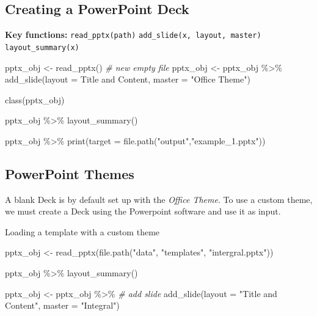 \documentclass[
]{book}
\newenvironment{Shaded}{\begin{snugshade}}{\end{snugshade}}
\newcommand{\AttributeTok}[1]{\textcolor[rgb]{0.77,0.63,0.00}{#1}}
\newcommand{\CommentTok}[1]{\textcolor[rgb]{0.56,0.35,0.01}{\textit{#1}}}
\newcommand{\FunctionTok}[1]{\textcolor[rgb]{0.00,0.00,0.00}{#1}}
\newcommand{\NormalTok}[1]{#1}
\newcommand{\OtherTok}[1]{\textcolor[rgb]{0.56,0.35,0.01}{#1}}
\newcommand{\SpecialCharTok}[1]{\textcolor[rgb]{0.00,0.00,0.00}{#1}}
\newcommand{\StringTok}[1]{\textcolor[rgb]{0.31,0.60,0.02}{#1}}
\begin{document}
\hypertarget{creating-a-powerpoint-deck}{%
\subsection{Creating a PowerPoint Deck}\label{creating-a-powerpoint-deck}}

\textbf{Key functions:}
\texttt{read\_pptx(path)} \texttt{add\_slide(x,\ layout,\ master)} \texttt{layout\_summary(x)}

\begin{Shaded}
\begin{Highlighting}[]
\NormalTok{pptx\_obj }\OtherTok{\textless{}{-}} \FunctionTok{read\_pptx}\NormalTok{() }\CommentTok{\# new empty file}
\NormalTok{pptx\_obj }\OtherTok{\textless{}{-}}\NormalTok{ pptx\_obj }\SpecialCharTok{\%\textgreater{}\%} 
  \FunctionTok{add\_slide}\NormalTok{(}\AttributeTok{layout  =} \StringTok{\textquotesingle{}Title and Content\textquotesingle{}}\NormalTok{, }\AttributeTok{master =} \StringTok{"Office Theme"}\NormalTok{)}

\FunctionTok{class}\NormalTok{(pptx\_obj)}

\NormalTok{pptx\_obj }\SpecialCharTok{\%\textgreater{}\%}
  \FunctionTok{layout\_summary}\NormalTok{()}

\NormalTok{pptx\_obj }\SpecialCharTok{\%\textgreater{}\%} 
  \FunctionTok{print}\NormalTok{(}\AttributeTok{target =} \FunctionTok{file.path}\NormalTok{(}\StringTok{"output"}\NormalTok{,}\StringTok{"example\_1.pptx"}\NormalTok{))}
\end{Highlighting}
\end{Shaded}

\hypertarget{powerpoint-themes}{%
\subsection{PowerPoint Themes}\label{powerpoint-themes}}

A blank Deck is by default set up with the \emph{Office Theme}. To use a custom theme, we must create a Deck using the Powerpoint software and use it as input.

Loading a template with a custom theme

\begin{Shaded}
\begin{Highlighting}[]
\NormalTok{pptx\_obj }\OtherTok{\textless{}{-}} \FunctionTok{read\_pptx}\NormalTok{(}\FunctionTok{file.path}\NormalTok{(}\StringTok{"data"}\NormalTok{, }\StringTok{"templates"}\NormalTok{, }\StringTok{"intergral.pptx"}\NormalTok{))}

\NormalTok{pptx\_obj }\SpecialCharTok{\%\textgreater{}\%} 
  \FunctionTok{layout\_summary}\NormalTok{()}

\NormalTok{pptx\_obj }\OtherTok{\textless{}{-}}\NormalTok{ pptx\_obj }\SpecialCharTok{\%\textgreater{}\%} \CommentTok{\# add slide}
  \FunctionTok{add\_slide}\NormalTok{(}\AttributeTok{layout =} \StringTok{"Title and Content"}\NormalTok{, }\AttributeTok{master =} \StringTok{"Integral"}\NormalTok{)}
\end{Highlighting}
\end{Shaded}
\end{document}
